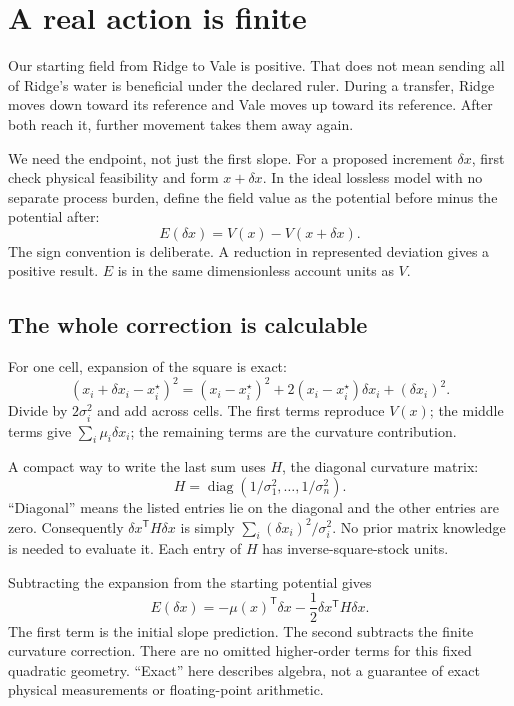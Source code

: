\chapter{A real action is finite}\label{ch:finite}

Our starting field from Ridge to Vale is positive. That does not mean sending all of Ridge's water is beneficial under the declared ruler. During a transfer, Ridge moves down toward its reference and Vale moves up toward its reference. After both reach it, further movement takes them away again.

We need the endpoint, not just the first slope. For a proposed increment $\delta x$, first check physical feasibility and form $x+\delta x$. In the ideal lossless model with no separate process burden, define the field value as the potential before minus the potential after:
\begin{equation}\label{eq:finite-def}
 E(\delta x)=V(x)-V(x+\delta x).
\end{equation}
The sign convention is deliberate. A reduction in represented deviation gives a positive result. $E$ is in the same dimensionless account units as $V$.

\section{The whole correction is calculable}
For one cell, expansion of the square is exact:
\begin{equation*}
 (x_i+\delta x_i-x_i^\star)^2
 =(x_i-x_i^\star)^2+2(x_i-x_i^\star)\delta x_i+(\delta x_i)^2.
\end{equation*}
Divide by $2\sigma_i^2$ and add across cells. The first terms reproduce $V(x)$; the middle terms give $\sum_i\mu_i\delta x_i$; the remaining terms are the curvature contribution.

A compact way to write the last sum uses $H$, the diagonal curvature matrix:
\begin{equation}\label{eq:hessian}
 H=\operatorname{diag}(1/\sigma_1^2,\ldots,1/\sigma_n^2).
\end{equation}
``Diagonal'' means the listed entries lie on the diagonal and the other entries are zero. Consequently $\delta x^{\mathsf T}H\delta x$ is simply $\sum_i(\delta x_i)^2/\sigma_i^2$. No prior matrix knowledge is needed to evaluate it. Each entry of $H$ has inverse-square-stock units.

Subtracting the expansion from the starting potential gives
\begin{equation}\label{eq:finite}
 \boxed{E(\delta x)=-\mu(x)^{\mathsf T}\delta x
 -\frac12\delta x^{\mathsf T}H\delta x.}
\end{equation}
The first term is the initial slope prediction. The second subtracts the finite curvature correction. There are no omitted higher-order terms for this fixed quadratic geometry. ``Exact'' here describes algebra, not a guarantee of exact physical measurements or floating-point arithmetic.\cite{gaussian,foundation}

